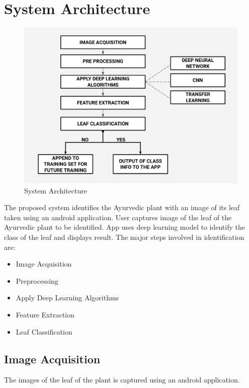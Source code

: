 \section{System Architecture}
\begin{figure}[h]
	\label{ss}
	\centering
	\includegraphics[width= 15.8 cm]{waterfall.png}
	\caption{System Architecture}
\end{figure}
The proposed system identifies the Ayurvedic plant with an image of its leaf taken using an android application.
User captures image of the leaf of the Ayurvedic plant to be identified.
App uses deep learning model to identify the class of the leaf and displays result. The major steps involved in identification are:\\
\begin{itemize}
 \item Image Acquisition
 \item  Preprocessing
 \item Apply Deep Learning Algorithms
 \item  Feature Extraction
 \item Leaf Classification
\end{itemize}


\subsection{Image Acquisition }
The images of the leaf of the plant is captured using an android application.
